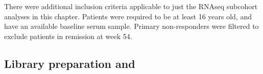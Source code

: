 %
There were additional inclusion criteria applicable to just the \gls{RNAseq} subcohort analyses in this chapter.
Patients were required to be at least 16 years old, and have an available baseline serum sample.
Primary non-responders were filtered to exclude patients in remission at week 54.

\subsection{Library preparation and }

